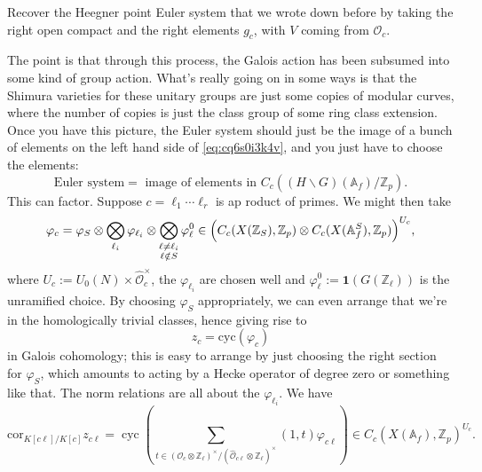 \documentclass[reqno]{amsart} 
\numberwithin{theorem}{section}
\numberwithin{equation}{section}
\numberwithin{exercise}{section}
\begin{document}
\begin{exercise}\label{exercise:cq6tho7823}
  Recover the Heegner point Euler system that we wrote down before by taking the right open compact and the right elements $g_c$, with $V$ coming from $\mathcal{O}_c$.
\end{exercise}
The point is that through this process, the Galois action has been subsumed into some kind of group action.  What's really going on in some ways is that the Shimura varieties for these unitary groups are just some copies of modular curves, where the number of copies is just the class group of some ring class extension.  Once you have this picture, the Euler system should just be the image of a bunch of elements on the left hand side of \eqref{eq:cq6s0i3k4v}, and you just have to choose the elements:
\begin{equation*}
  \text{Euler system} = \text{ image of elements in } C_c((H \backslash G)(\mathbb{A}_f) / \mathbb{Z}_p).
\end{equation*}
This can factor.  Suppose $c = \ell_1 \dotsb \ell_r$ is ap roduct of primes.  We might then take
\begin{equation*}
  \varphi_c = \varphi_S \otimes \bigotimes_{\ell_i} \varphi_{\ell_i} \otimes \bigotimes_{
    \substack{
      \ell \neq \ell_i  \\
      \ell \notin S      
    }
  }
  \varphi_{\ell}^0 \in \Bigl(C_c(X(\mathbb{Z}_S), \mathbb{Z}_p) \otimes C_c(X(\mathbb{A}_f^S), \mathbb{Z}_p)\Bigr)^{U_c},
\end{equation*}
where $U_c := U_0(N) \times \hat{\mathcal{O}}_c^\times$, the $\varphi_{\ell_i}$ are chosen well and $\varphi_{\ell}^0 := \mathbf{1}(G(\mathbb{Z}_{\ell}))$ is the unramified choice.  By choosing $\varphi_S$ appropriately, we can even arrange that we're in the homologically trivial classes, hence giving rise to
\begin{equation*}
  z_c = \mathrm{cyc}(\varphi_c)
\end{equation*}
in Galois cohomology; this is easy to arrange by just choosing the right section for $\varphi_S$, which amounts to acting by a Hecke operator of degree zero or something like that.  The norm relations are all about the $\varphi_{\ell_i}$.  We have
\begin{equation*}
  \mathrm{cor}_{K[c \ell] / K[c]} z_{c \ell} =
  \operatorname{cyc}
  \left(
    \sum_{
      t \in (\mathcal{O}_c \otimes \mathbb{Z}_{\ell} )^\times /(\hat{\mathcal{O}}_{c \ell} \otimes \mathbb{Z}_{\ell})^\times
    }
    (1, t) \varphi_{c \ell}
  \right)
  \in C_c(X(\mathbb{A}_f), \mathbb{Z}_p)^{U_c}.
\end{equation*}
\end{document}
